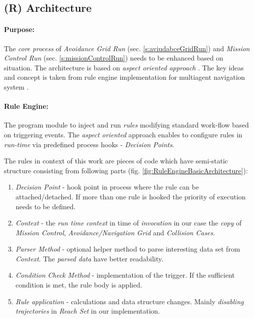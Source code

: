 \setcounter{chapter}{6}
\setcounter{section}{8}
\subsection{(R) Architecture}\label{s:RuleEngineArchitecture}

\paragraph{Purpose:} The \emph{core process} of \emph{Avoidance Grid Run} (sec. \ref{s:aviudabceGridRun}) and \emph{Mission Control Run} (sec. \ref{s:missionControlRun}) needs to be enhanced based on  situation. The architecture is based on \emph{aspect oriented approach} \cite{hill2003jess}. The key ideas and concept is taken from rule engine implementation for multiagent  navigation system \cite{seyboth2013event}.

\paragraph{Rule Engine:} The program module to inject and run \emph{rules} modifying standard work-flow based on  triggering events. The \emph{aspect oriented} approach enables to configure rules in \emph{run-time} via predefined process hooks - \emph{Decision Points}. 

The rules in context of this work are pieces of code which have semi-static structure consisting from following parts (fig. \ref{fig:RuleEngineBasicArchitecture}):

\begin{enumerate}
    \item \emph{Decision Point} - hook point in process where the rule can be attached/detached. If more than one rule is hooked the priority of execution needs to be defined. 
    
    \item \emph{Context} - the \emph{run time context} in time of \emph{invocation} in our case the \emph{copy} of \emph{Mission Control}, \emph{Avoidance/Navigation Grid} and \emph{Collision Cases}.
    
    \item \emph{Parser Method} - optional helper method to parse interesting data set from \emph{Context}. The \emph{parsed data} have better readability.
    
    \item \emph{Condition Check Method} - implementation of the trigger. If the sufficient condition is met, the rule body is applied.
    
    \item \emph{Rule application} - calculations and data structure changes. Mainly \emph{disabling trajectories} in \emph{Reach Set} in our implementation.     
\end{enumerate}


